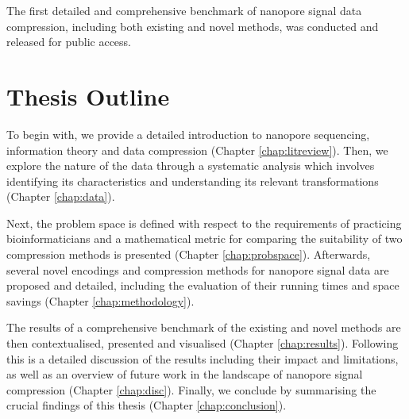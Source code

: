 The first detailed and comprehensive benchmark of nanopore signal data
compression, including both existing and novel methods, was conducted and
released for public access.

\section{Thesis Outline}

To begin with, we provide a detailed introduction to nanopore sequencing,
information theory and data compression (Chapter \ref{chap:litreview}). Then, we
explore the nature of the data through a systematic analysis which involves
identifying its characteristics and understanding its relevant transformations
(Chapter \ref{chap:data}).

Next, the problem space is defined with respect to the requirements of
practicing bioinformaticians and a mathematical metric for comparing the
suitability of two compression methods is presented (Chapter
\ref{chap:probspace}). Afterwards, several novel encodings and compression
methods for nanopore signal data are proposed and detailed, including the
evaluation of their running times and space savings (Chapter
\ref{chap:methodology}).

The results of a comprehensive benchmark of the existing and novel methods are
then contextualised, presented and visualised (Chapter \ref{chap:results}).
Following this is a detailed discussion of the results including their impact
and limitations, as well as an overview of future work in the landscape of
nanopore signal compression (Chapter \ref{chap:disc}). Finally, we conclude by
summarising the crucial findings of this thesis (Chapter \ref{chap:conclusion}).
